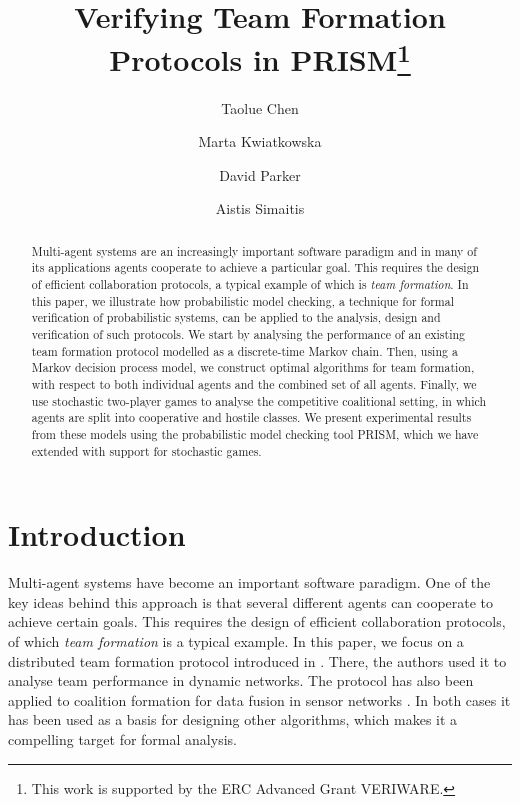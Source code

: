 \documentclass{llncs}
\newcommand{\taolue}[1]{\marginpar{\footnotesize \color{red} {\bf TL:} \textsf{#1}}}
\begin{document}
\title{Verifying Team Formation Protocols in PRISM\thanks{This work is supported by
the ERC Advanced Grant VERIWARE.}}
\author{Taolue Chen \and Marta Kwiatkowska \and David Parker \and Aistis Simaitis}
\email{}

\maketitle
\vspace{-10pt}
\begin{abstract}
Multi-agent systems are an increasingly important software paradigm and in many of
its applications agents cooperate to achieve a particular goal.
This requires the design of efficient collaboration protocols,
a typical example of which is \emph{team formation}.
In this paper, we illustrate how probabilistic model checking,
a technique for formal verification of probabilistic systems,
can be applied to the analysis, design and verification of such protocols.
We start by analysing the performance of an existing team formation protocol
modelled as a discrete-time Markov chain.
Then, using a Markov decision process model,
we construct optimal algorithms for team formation,
with respect to both individual agents and the combined set of all agents.
Finally, we use stochastic two-player games to analyse the competitive coalitional setting,
in which agents are split into cooperative and hostile classes.
We present experimental results from these models
using the probabilistic model checking tool PRISM,
which we have extended with support for stochastic games.
\end{abstract}
\vspace{-25pt}
\section{Introduction}
\vspace{-5pt}
Multi-agent systems have become an important software paradigm. One of the
key ideas behind this approach is that several different agents can cooperate to achieve certain goals.
This requires the design of efficient collaboration protocols, of which \emph{team formation} is a typical example. In this paper, we focus on a distributed team formation protocol introduced in \cite{gaston2005agent}. There, the authors used it to analyse team performance in dynamic networks.
The protocol %
has also been applied to coalition formation for data fusion in sensor networks \cite{glinton2008agent}. In both cases it has been used as a basis for designing other algorithms, which makes it a compelling target for formal analysis.
\end{document}
